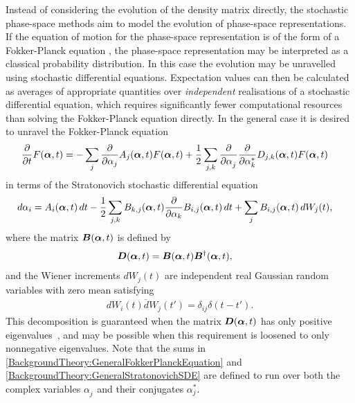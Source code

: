 Instead of considering the evolution of the density matrix directly, the stochastic phase-space methods aim to model the evolution of phase-space representations.  If the equation of motion for the phase-space representation is of the form of a Fokker-Planck equation \citep{GardinerHSM}, the phase-space representation may be interpreted as a classical probability distribution.  In this case the evolution may be unravelled using stochastic differential equations.  Expectation values can then be calculated as averages of appropriate quantities over \emph{independent} realisations of a stochastic differential equation, which requires significantly fewer computational resources than solving the Fokker-Planck equation directly.  In the general case it is desired to unravel the Fokker-Planck equation
\begin{align}
    \frac{\partial}{\partial t}F(\vect{\alpha}, t) &= - \sum_j \frac{\partial}{\partial \alpha_j} A_j(\vect{\alpha}, t) F(\vect{\alpha}, t) + \frac{1}{2} \sum_{j, k} \frac{\partial}{\partial \alpha_j^{\phantom{*}}} \frac{\partial}{\partial \alpha_k^*} D_{j,k}(\vect{\alpha}, t) F(\vect{\alpha}, t) \label{BackgroundTheory:GeneralFokkerPlanckEquation}
\end{align}
in terms of the Stratonovich stochastic differential equation \citep{GardinerHSM}
\begin{align}
    d \alpha_i &= A_i(\vect{\alpha}, t)\, dt  - \frac{1}{2} \sum_{j, k} B_{k, j}(\vect{\alpha}, t) \frac{\partial }{\partial \alpha_k}B_{i,j}(\vect{\alpha}, t) \, dt + \sum_j B_{i,j}(\vect{\alpha}, t) \,d W_j(t), \label{BackgroundTheory:GeneralStratonovichSDE}
\end{align}
where the matrix $\bm{B}(\bm{\alpha}, t)$ is defined by
\begin{align}
    \bm{D}(\bm{\alpha}, t) &= \bm{B}(\bm{\alpha}, t) \bm{B}^\dagger(\bm{\alpha}, t),
\end{align}
and the Wiener increments $d W_j(t)$ are independent real Gaussian random variables with zero mean satisfying
\begin{align}
    \overline{d W_i(t) dW_j(t')} = \delta_{i j}\delta(t - t').
\end{align}
This decomposition is guaranteed when the matrix $\bm{D}(\bm{\alpha}, t)$ has only positive eigenvalues~\citep{GardinerHSM}, and may be possible when this requirement is loosened to only nonnegative eigenvalues. Note that the sums in \eqref{BackgroundTheory:GeneralFokkerPlanckEquation} and \eqref{BackgroundTheory:GeneralStratonovichSDE} are defined to run over both the complex variables $\alpha_j^{\phantom{*}}$ and their conjugates $\alpha_j^*$.

